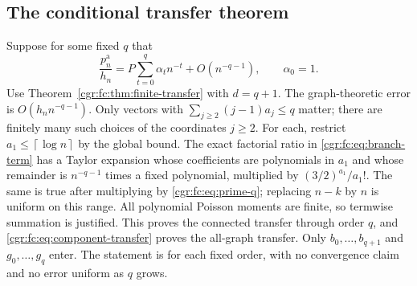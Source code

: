 \documentclass[11pt,letterpaper]{article}
\numberwithin{equation}{section}
\theoremstyle{definition}\newtheorem{definition}[theorem]{Definition}
\theoremstyle{remark}\newtheorem{remark}[theorem]{Remark}
\newcommand{\ceil}[1]{\left\lceil #1\right\rceil}
\begin{document}
\subsection{The conditional transfer theorem}\label{cgr:fc:sub:conditional}
Suppose for some fixed $q$ that
\begin{equation}\label{cgr:fc:eq:prime-q}
 \frac{p_n^{\mathrm a}}{h_n}
 =P\sum_{t=0}^q\alpha_t n^{-t}+O(n^{-q-1}),\qquad\alpha_0=1.
\end{equation}
Use Theorem~\ref{cgr:fc:thm:finite-transfer} with $d=q+1$.
The graph-theoretic error is $O(h_n n^{-q-1})$.
Only vectors with $\sum_{j\ge2}(j-1)a_j\le q$ matter; there
are finitely many such choices of the coordinates $j\ge2$.
For each, restrict $a_1\le\ceil{\log n}$ by the global bound.
The exact factorial ratio in \eqref{cgr:fc:eq:branch-term} has a Taylor
expansion whose coefficients are polynomials in $a_1$ and whose
remainder is $n^{-q-1}$ times a fixed polynomial, multiplied by
$(3/2)^{a_1}/a_1!$. The same is true after multiplying by
\eqref{cgr:fc:eq:prime-q}; replacing $n-k$ by $n$ is uniform on this
range. All polynomial Poisson moments are finite, so termwise
summation is justified. This proves the connected transfer through
order $q$, and \eqref{cgr:fc:eq:component-transfer} proves the all-graph
transfer. Only $b_0,\ldots,b_{q+1}$ and $g_0,\ldots,g_q$ enter.
The statement is for each fixed order, with no convergence claim
and no error uniform as $q$ grows.
\end{document}
